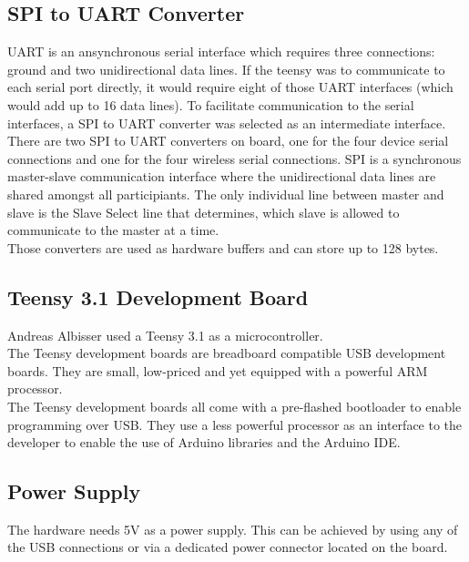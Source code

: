 \subsection{SPI to UART Converter}
UART is an ansynchronous serial interface which requires three connections: ground and two unidirectional data lines. If the teensy was to communicate to each serial port directly, it would require eight of those UART interfaces (which would add up to 16 data lines). To facilitate communication to the serial interfaces, a SPI to UART converter was selected as an intermediate interface.\\
There are two SPI to UART converters on board, one for the four device serial connections and one for the four wireless serial connections. SPI is a synchronous master-slave communication interface where the unidirectional data lines are shared amongst all participiants. The only individual line between master and slave is the Slave Select line that determines, which slave is allowed to communicate to the master at a time. \\
Those converters are used as hardware buffers and can store up to 128 bytes.\\
%
%
\subsection{Teensy 3.1 Development Board}
Andreas Albisser used a Teensy 3.1 as a microcontroller.\\
The Teensy development boards are breadboard compatible USB development boards. They are small, low-priced and yet equipped with a powerful ARM processor.\\
The Teensy development boards all come with a pre-flashed bootloader to enable programming over USB. They use a less powerful processor as an interface to the developer to enable the use of Arduino libraries and the Arduino IDE.\\
%
%
\subsection{Power Supply}
The hardware needs 5V as a power supply. This can be achieved by using any of the USB connections or via a dedicated power connector located on the board. \\
%
%
